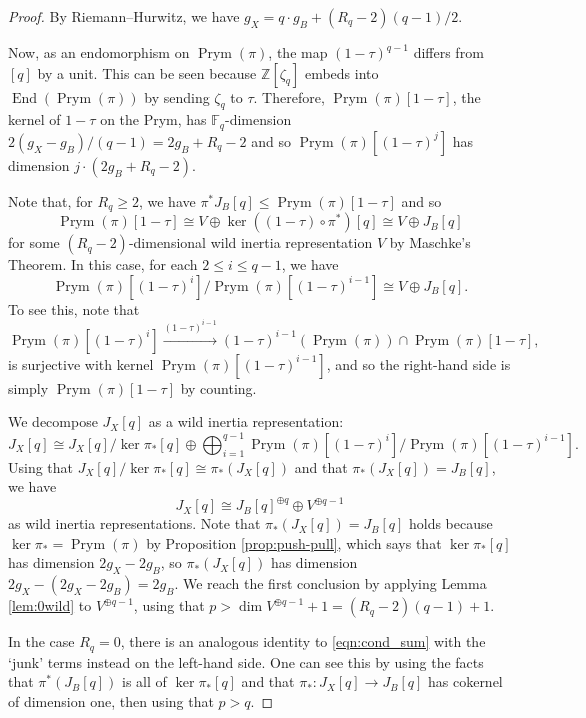 \documentclass[10pt,a4paper]{amsart}
\DeclareMathOperator{\End}{End}
\newcommand{\FF}{\mathbb{F}}
\DeclareMathOperator{\Prym}{Prym}
\newcommand{\ZZ}{\mathbb{Z}}
\begin{document}
\begin{proof}
    By Riemann--Hurwitz, we have $g_X=q\cdot g_B + (R_q-2)(q-1)/2$.

    Now, as an endomorphism on $\Prym(\pi)$, the map $(1-\tau)^{q-1}$ differs from $[q]$ by a unit. This can be seen because $\ZZ[\zeta_q]$ embeds into $\End(\Prym(\pi))$ by sending $\zeta_q$ to $\tau$. Therefore, $\Prym(\pi)[1-\tau]$, the kernel of $1-\tau$ on the Prym, has $\FF_q$-dimension $2(g_X-g_B)/(q-1)=2g_B+R_q-2$ and so $\Prym(\pi)[(1-\tau)^{j}]$ has dimension $j \cdot (2g_B+R_q-2)$.

    Note that, for $R_q\ge2$, we have $\pi^*J_B[q]\le\Prym(\pi)[1-\tau]$ and so 
    \[\Prym(\pi)[1-\tau]\cong V\oplus \ker((1-\tau)\circ\pi^*)[q]\cong V\oplus J_B[q]\] 
    for some $(R_q-2)$-dimensional wild inertia representation $V$ by Maschke's Theorem. In this case, for each $2\le i\le q-1$, we have
    \[ \Prym(\pi)[(1-\tau)^i]/\Prym(\pi)[(1-\tau)^{i-1}] \cong V\oplus J_B[q].\]
    To see this, note that
    \[\Prym(\pi)[(1-\tau)^i]\xrightarrow{(1-\tau)^{i-1}} (1-\tau)^{i-1}(\Prym(\pi))\cap \Prym(\pi)[1-\tau],\]
    is surjective with kernel $\Prym(\pi)[(1-\tau)^{i-1}]$, and so the right-hand side is simply $\Prym(\pi)[1-\tau]$ by counting.

    We decompose $J_X[q]$ as a wild inertia representation:
    \begin{equation}
        J_X[q] \cong J_X[q]/\ker\pi_*[q] \oplus \bigoplus_{i=1}^{q-1} \Prym(\pi)[(1-\tau)^i]/\Prym(\pi)[(1-\tau)^{i-1}].
    \end{equation}
    Using that $J_X[q]/\ker\pi_*[q]\cong\pi_*(J_X[q])$ and that $\pi_*(J_X[q])=J_B[q]$, we have
    \begin{equation}\label{eqn:cond_sum}\tag{$\dagger$}
        J_X[q]\cong J_B[q]^{\oplus q}\oplus V^{\oplus q-1}
    \end{equation}
    as wild inertia representations. Note that $\pi_*(J_X[q])=J_B[q]$ holds because $\ker\pi_*=\Prym(\pi)$ by Proposition \ref{prop:push-pull}, which says that $\ker\pi_*[q]$ has dimension $2g_X-2g_B$, so $\pi_*(J_X[q])$ has dimension $2g_X - (2g_X-2g_B) = 2g_B$. We reach the first conclusion by applying Lemma \ref{lem:0wild} to $V^{\oplus q-1}$, using that $p>\dim V^{\oplus q-1} +1 = (R_q-2)(q-1)+1$. 

    In the case $R_q=0$, there is an analogous identity to \eqref{eqn:cond_sum} with the `junk' terms instead on the left-hand side. One can see this by using the facts that $\pi^*(J_B[q])$ is all of $\ker\pi_*[q]$ and that $\pi_*: J_X[q]\to J_B[q]$ has cokernel of dimension one, then using that $p>q$.


\end{proof}
\end{document}

